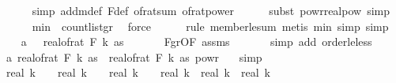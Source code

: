 \begin{isabellebody}
\ \ \ \ \isamarkupfalse%
\ {\isacharparenleft}{\kern0pt}simp\ add{\isacharcolon}{\kern0pt}m{\isacharunderscore}{\kern0pt}def\ F{\isacharunderscore}{\kern0pt}def\ of{\isacharunderscore}{\kern0pt}rat{\isacharunderscore}{\kern0pt}sum\ of{\isacharunderscore}{\kern0pt}rat{\isacharunderscore}{\kern0pt}power{\isacharparenright}{\kern0pt}\isanewline
\ \ \ \ \isamarkupfalse%
\ {\isacharparenleft}{\kern0pt}subst\ powr{\isacharunderscore}{\kern0pt}realpow{\isacharcomma}{\kern0pt}\ simp{\isacharparenright}{\kern0pt}\ \isanewline
\ \ \ \ \isamarkupfalse%
\ m{\isacharunderscore}{\kern0pt}in\ \ count{\isacharunderscore}{\kern0pt}list{\isacharunderscore}{\kern0pt}gr{\isacharunderscore}{\kern0pt}{}\ \isamarkupfalse%
\ force\isanewline
\ \ \ \ \isamarkupfalse%
\ {\isacharparenleft}{\kern0pt}rule\ member{\isacharunderscore}{\kern0pt}le{\isacharunderscore}{\kern0pt}sum{\isacharcomma}{\kern0pt}\ metis\ m{\isacharunderscore}{\kern0pt}in{\isacharcomma}{\kern0pt}\ simp{\isacharcomma}{\kern0pt}\ simp{\isacharparenright}{\kern0pt}\isanewline
\isanewline
\ \ \isamarkupfalse%
\ a{}{\isacharcolon}{\kern0pt}\ {\isachardoublequoteopen}{}\ {\isasymle}\ real{\isacharunderscore}{\kern0pt}of{\isacharunderscore}{\kern0pt}rat\ {\isacharparenleft}{\kern0pt}F\ k\ as{\isacharparenright}{\kern0pt}{\isachardoublequoteclose}\ \isanewline
\ \ \ \ \isamarkupfalse%
\ F{\isacharunderscore}{\kern0pt}gr{\isacharunderscore}{\kern0pt}{}{\isacharbrackleft}{\kern0pt}OF\ assms{\isacharparenleft}{\kern0pt}{}{\isacharparenright}{\kern0pt}{\isacharbrackright}{\kern0pt}\ \isanewline
\ \ \ \ \isamarkupfalse%
\ {\isacharparenleft}{\kern0pt}simp\ add{\isacharcolon}{\kern0pt}\ order{\isacharunderscore}{\kern0pt}le{\isacharunderscore}{\kern0pt}less{\isacharparenright}{\kern0pt}\isanewline
\ \ \isamarkupfalse%
\ a{}{\isacharcolon}{\kern0pt}\ {\isachardoublequoteopen}real{\isacharunderscore}{\kern0pt}of{\isacharunderscore}{\kern0pt}rat\ {\isacharparenleft}{\kern0pt}F\ k\ as{\isacharparenright}{\kern0pt}\ {\isacharequal}{\kern0pt}\ real{\isacharunderscore}{\kern0pt}of{\isacharunderscore}{\kern0pt}rat\ {\isacharparenleft}{\kern0pt}F\ k\ as{\isacharparenright}{\kern0pt}\ powr\ {}{\isachardoublequoteclose}\ \isamarkupfalse%
\ simp\isanewline
\isanewline
\ \ \isamarkupfalse%
\ {\isachardoublequoteopen}real\ {\isacharparenleft}{\kern0pt}k\ {\isacharminus}{\kern0pt}\ {}{\isacharparenright}{\kern0pt}\ {\isacharslash}{\kern0pt}\ real\ k\ {\isacharplus}{\kern0pt}\ {}\ {\isacharequal}{\kern0pt}\ real\ {\isacharparenleft}{\kern0pt}k\ {\isacharminus}{\kern0pt}\ {}{\isacharparenright}{\kern0pt}\ {\isacharslash}{\kern0pt}\ real\ k\ {\isacharplus}{\kern0pt}\ real\ k\ {\isacharslash}{\kern0pt}\ real\ k{\isachardoublequoteclose}\isanewline

\end{isabellebody}
